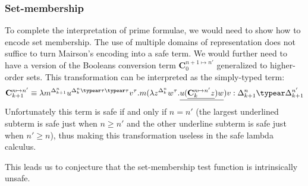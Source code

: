 \subsubsection{Set-membership}
To complete the interpretation of prime formulae, we would need to show how to encode set membership. The use of multiple domains of representation does not suffice to turn Mairson's encoding into a safe term. We would further need to have a version of the Booleans conversion term $\mathbf{C}^{n+1\mapsto n'}_0$ generalized to higher-order sets.
This transformation can be interpreted as the simply-typed term:
$$ \mathbf{C}^{n\mapsto n'}_{k+1} \equiv \lambda m^{\Delta_{k+1}^n} u^{\Delta_k^n\typear \tau\typear \tau} v^\tau. m (\lambda z^{\Delta_k^n} w^\tau . \underline{u (\underline{\mathbf{C}^{n\mapsto n'}_k z}) w}) v : \Delta_{k+1}^n \typear \Delta_{k+1}^{n'}$$
Unfortunately this term is safe if and only if $n=n'$ (the largest
underlined subterm is safe just when $n\geq n'$ and the other
underline subterm is safe just when $n'\geq n$), thus making this
transformation useless in the safe lambda calculus.

This leads us to conjecture that the set-membership test function is intrinsically unsafe.
\smallskip



